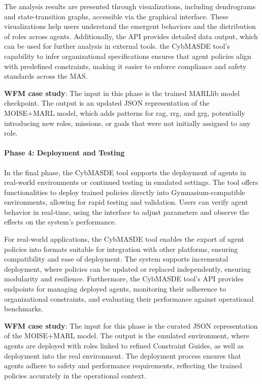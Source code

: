 \documentclass[sigconf,anonymous]{aamas}
\begin{document}
The analysis results are presented through visualizations, including dendrograms and state-transition graphs, accessible via the graphical interface. These visualizations help users understand the emergent behaviors and the distribution of roles across agents. Additionally, the API provides detailed data output, which can be used for further analysis in external tools. the CybMASDE tool's capability to infer organizational specifications ensures that agent policies align with predefined constraints, making it easier to enforce compliance and safety standards across the MAS.

\textbf{WFM case study}: The input in this phase is the trained MARLlib model checkpoint. The output is an updated JSON representation of the MOISE+MARL model, which adds patterns for rag, rrg, and grg, potentially introducing new roles, missions, or goals that were not initially assigned to any role.

\paragraph{Phase 4: Deployment and Testing}

In the final phase, the CybMASDE tool supports the deployment of agents in real-world environments or continued testing in emulated settings. The tool offers functionalities to deploy trained policies directly into Gymnasium-compatible environments, allowing for rapid testing and validation. Users can verify agent behavior in real-time, using the interface to adjust parameters and observe the effects on the system's performance.

For real-world applications, the CybMASDE tool enables the export of agent policies into formats suitable for integration with other platforms, ensuring compatibility and ease of deployment. The system supports incremental deployment, where policies can be updated or replaced independently, ensuring modularity and resilience. Furthermore, the CybMASDE tool's API provides endpoints for managing deployed agents, monitoring their adherence to organizational constraints, and evaluating their performance against operational benchmarks.

\textbf{WFM case study}: The input for this phase is the curated JSON representation of the MOISE+MARL model. The output is the emulated environment, where agents are deployed with roles linked to refined Constraint Guides, as well as deployment into the real environment. The deployment process ensures that agents adhere to safety and performance requirements, reflecting the trained policies accurately in the operational context.
\end{document}

